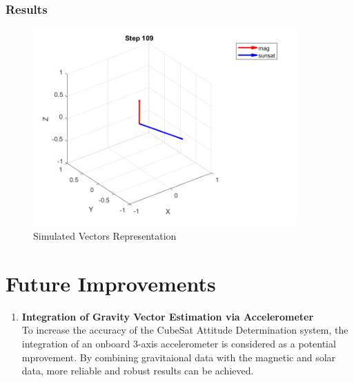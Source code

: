 \documentclass[a4paper, 12pt]{article}
\begin{document}
\subsubsection{Results}
\begin{figure}[H]  %
    \centering
    \includegraphics[width=0.9\textwidth]{fig/SimuResult.png}
    \caption{Simulated Vectors Representation}
    \label{fig:Simulated Vectors Representation}
\end{figure}

\section{Future Improvements}
\begin{enumerate}
\item \textbf{Integration of Gravity Vector Estimation via Accelerometer} \\ [0.3cm]
To increase the accuracy of the CubeSat Attitude Determination system, the integration of an onboard 3-axis accelerometer is considered as a potential mprovement. By combining gravitaional data with the magnetic and solar data, more reliable and robust results can be achieved.
\end{enumerate}

\newpage


\end{document}

